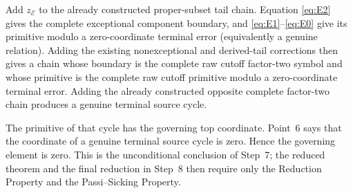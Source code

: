 \documentclass[11pt]{article}
\begin{document}
Add \(z_{\mathcal E}\) to the already constructed proper-subset tail chain.
Equation \eqref{eq:E2} gives the complete exceptional component boundary,
and \eqref{eq:E1}--\eqref{eq:E0} give its primitive modulo a zero-coordinate
terminal error (equivalently a genuine relation).  Adding the existing
nonexceptional and derived-tail corrections then gives a chain whose boundary
is the complete raw cutoff factor-two symbol and whose primitive is the
complete raw cutoff primitive modulo a zero-coordinate terminal error.
Adding the already constructed opposite complete factor-two chain produces a
genuine terminal source cycle.

The primitive of that cycle has the governing top coordinate.  Point~6 says
that the coordinate of a genuine terminal source cycle is zero.  Hence the
governing element is zero.  This is the unconditional conclusion of Step~7;
the reduced theorem and the final reduction in Step~8 then require only the
Reduction Property and the Passi--Sicking Property.
\end{document}
